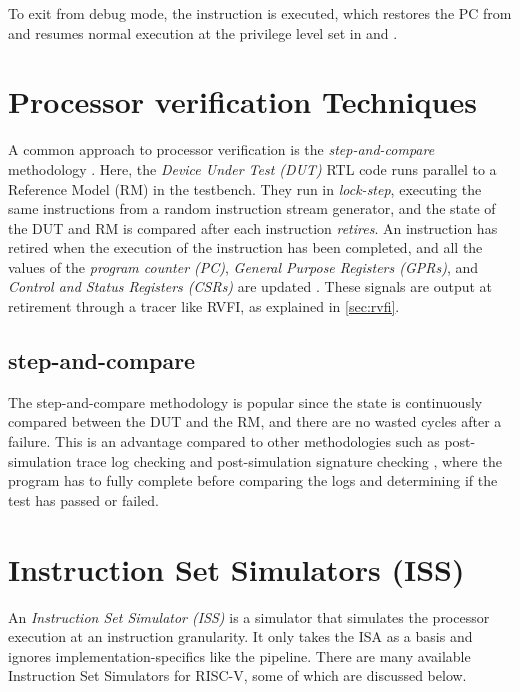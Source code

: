 To exit from debug mode, the  instruction is executed, which restores the PC from  and resumes normal execution at the privilege level set in  and  \cite{pauldonahueRISCVDebugSupport2023}.

\section{Processor verification Techniques}
\label{sec:bg_verificationTech}


A common approach to processor verification is the \textit{step-and-compare} methodology \cite{taylorAdvancedRISCVVerification2023}. Here, the \textit{Device Under Test (DUT)} RTL code runs parallel to a Reference Model (RM) in the testbench. They run in \textit{lock-step}, executing the same instructions from a random instruction stream generator, and the state of the DUT and RM is compared after each instruction \textit{retires}. An instruction has retired when the execution of the instruction has been completed, and all the values of the \textit{program counter (PC)}, \textit{General Purpose Registers (GPRs)}, and \textit{Control and Status Registers (CSRs)} are updated \cite{taylorAdvancedRISCVVerification2023}. These signals are output at retirement through a tracer like RVFI, as explained in \cref{sec:rvfi}.

\subsection{step-and-compare}
\label{sec:step-and-compare}
The step-and-compare methodology is popular since the state is continuously compared between the DUT and the RM, and there are no wasted cycles after a failure. This is an advantage compared to other methodologies such as post-simulation trace log checking and post-simulation signature checking \cite{duncangrahamRISCVVerificationImplications2023}, where the program has to fully complete before comparing the logs and determining if the test has passed or failed.

\section{Instruction Set Simulators (ISS) }
\label{sec:bg_iss}

An \textit{Instruction Set Simulator (ISS)} is a simulator that simulates the processor execution at an instruction granularity.
It only takes the ISA as a basis and ignores implementation-specifics like the pipeline.
There are many available Instruction Set Simulators for RISC-V, some of which are discussed below.

